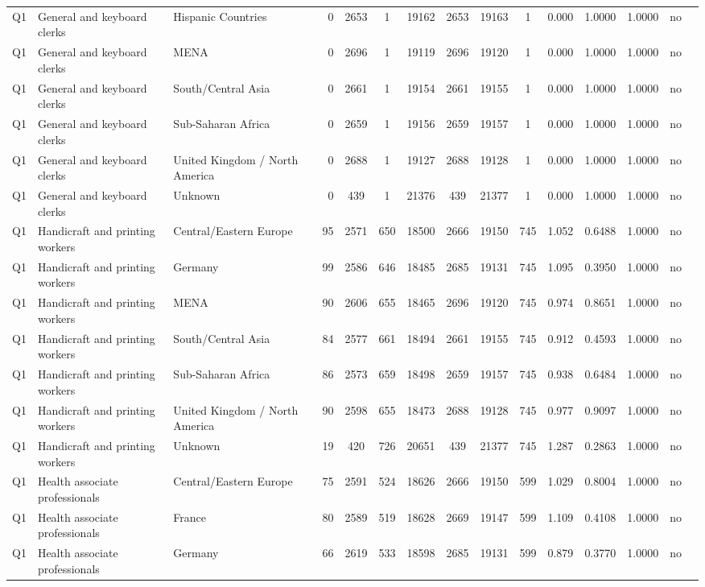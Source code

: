 \begin{longtable}{lllrcccccccccll}
Q1 & General and keyboard clerks & Hispanic Countries & 0 & 2653 & 1 & 19162 & 2653 & 19163 & 1 & 0.000 & 1.0000 & 1.0000 & no \\
Q1 & General and keyboard clerks & MENA & 0 & 2696 & 1 & 19119 & 2696 & 19120 & 1 & 0.000 & 1.0000 & 1.0000 & no \\
Q1 & General and keyboard clerks & South/Central Asia & 0 & 2661 & 1 & 19154 & 2661 & 19155 & 1 & 0.000 & 1.0000 & 1.0000 & no \\
Q1 & General and keyboard clerks & Sub-Saharan Africa & 0 & 2659 & 1 & 19156 & 2659 & 19157 & 1 & 0.000 & 1.0000 & 1.0000 & no \\
Q1 & General and keyboard clerks & United Kingdom / North America & 0 & 2688 & 1 & 19127 & 2688 & 19128 & 1 & 0.000 & 1.0000 & 1.0000 & no \\
Q1 & General and keyboard clerks & Unknown & 0 & 439 & 1 & 21376 & 439 & 21377 & 1 & 0.000 & 1.0000 & 1.0000 & no \\
Q1 & Handicraft and printing workers & Central/Eastern Europe & 95 & 2571 & 650 & 18500 & 2666 & 19150 & 745 & 1.052 & 0.6488 & 1.0000 & no \\
Q1 & Handicraft and printing workers & Germany & 99 & 2586 & 646 & 18485 & 2685 & 19131 & 745 & 1.095 & 0.3950 & 1.0000 & no \\
Q1 & Handicraft and printing workers & MENA & 90 & 2606 & 655 & 18465 & 2696 & 19120 & 745 & 0.974 & 0.8651 & 1.0000 & no \\
Q1 & Handicraft and printing workers & South/Central Asia & 84 & 2577 & 661 & 18494 & 2661 & 19155 & 745 & 0.912 & 0.4593 & 1.0000 & no \\
Q1 & Handicraft and printing workers & Sub-Saharan Africa & 86 & 2573 & 659 & 18498 & 2659 & 19157 & 745 & 0.938 & 0.6484 & 1.0000 & no \\
Q1 & Handicraft and printing workers & United Kingdom / North America & 90 & 2598 & 655 & 18473 & 2688 & 19128 & 745 & 0.977 & 0.9097 & 1.0000 & no \\
Q1 & Handicraft and printing workers & Unknown & 19 & 420 & 726 & 20651 & 439 & 21377 & 745 & 1.287 & 0.2863 & 1.0000 & no \\
Q1 & Health associate professionals & Central/Eastern Europe & 75 & 2591 & 524 & 18626 & 2666 & 19150 & 599 & 1.029 & 0.8004 & 1.0000 & no \\
Q1 & Health associate professionals & France & 80 & 2589 & 519 & 18628 & 2669 & 19147 & 599 & 1.109 & 0.4108 & 1.0000 & no \\
Q1 & Health associate professionals & Germany & 66 & 2619 & 533 & 18598 & 2685 & 19131 & 599 & 0.879 & 0.3770 & 1.0000 & no \\

\end{longtable}
